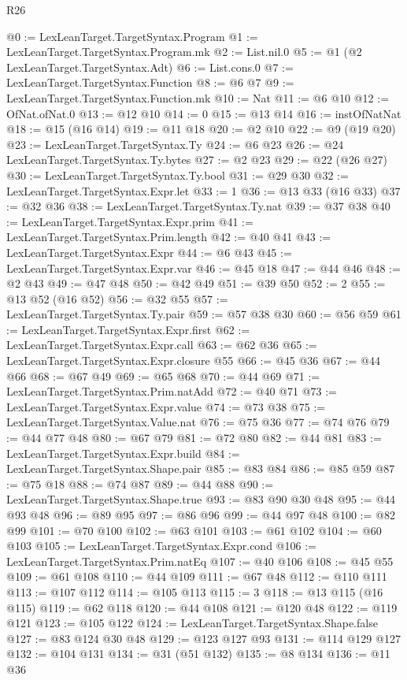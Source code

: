 \begin{lexlean}{R26}
\begin{coremodule}
@0 := LexLeanTarget.TargetSyntax.Program
@1 := LexLeanTarget.TargetSyntax.Program.mk
@2 := List.nil.{0}
@5 := @1 (@2 LexLeanTarget.TargetSyntax.Adt)
@6 := List.cons.{0}
@7 := LexLeanTarget.TargetSyntax.Function
@8 := @6 @7
@9 := LexLeanTarget.TargetSyntax.Function.mk
@10 := Nat
@11 := @6 @10
@12 := OfNat.ofNat.{0}
@13 := @12 @10
@14 := 0
@15 := @13 @14
@16 := instOfNatNat
@18 := @15 (@16 @14)
@19 := @11 @18
@20 := @2 @10
@22 := @9 (@19 @20)
@23 := LexLeanTarget.TargetSyntax.Ty
@24 := @6 @23
@26 := @24 LexLeanTarget.TargetSyntax.Ty.bytes
@27 := @2 @23
@29 := @22 (@26 @27)
@30 := LexLeanTarget.TargetSyntax.Ty.bool
@31 := @29 @30
@32 := LexLeanTarget.TargetSyntax.Expr.let
@33 := 1
@36 := @13 @33 (@16 @33)
@37 := @32 @36
@38 := LexLeanTarget.TargetSyntax.Ty.nat
@39 := @37 @38
@40 := LexLeanTarget.TargetSyntax.Expr.prim
@41 := LexLeanTarget.TargetSyntax.Prim.length
@42 := @40 @41
@43 := LexLeanTarget.TargetSyntax.Expr
@44 := @6 @43
@45 := LexLeanTarget.TargetSyntax.Expr.var
@46 := @45 @18
@47 := @44 @46
@48 := @2 @43
@49 := @47 @48
@50 := @42 @49
@51 := @39 @50
@52 := 2
@55 := @13 @52 (@16 @52)
@56 := @32 @55
@57 := LexLeanTarget.TargetSyntax.Ty.pair
@59 := @57 @38 @30
@60 := @56 @59
@61 := LexLeanTarget.TargetSyntax.Expr.first
@62 := LexLeanTarget.TargetSyntax.Expr.call
@63 := @62 @36
@65 := LexLeanTarget.TargetSyntax.Expr.closure @55
@66 := @45 @36
@67 := @44 @66
@68 := @67 @49
@69 := @65 @68
@70 := @44 @69
@71 := LexLeanTarget.TargetSyntax.Prim.natAdd
@72 := @40 @71
@73 := LexLeanTarget.TargetSyntax.Expr.value
@74 := @73 @38
@75 := LexLeanTarget.TargetSyntax.Value.nat
@76 := @75 @36
@77 := @74 @76
@79 := @44 @77 @48
@80 := @67 @79
@81 := @72 @80
@82 := @44 @81
@83 := LexLeanTarget.TargetSyntax.Expr.build
@84 := LexLeanTarget.TargetSyntax.Shape.pair
@85 := @83 @84
@86 := @85 @59
@87 := @75 @18
@88 := @74 @87
@89 := @44 @88
@90 := LexLeanTarget.TargetSyntax.Shape.true
@93 := @83 @90 @30 @48
@95 := @44 @93 @48
@96 := @89 @95
@97 := @86 @96
@99 := @44 @97 @48
@100 := @82 @99
@101 := @70 @100
@102 := @63 @101
@103 := @61 @102
@104 := @60 @103
@105 := LexLeanTarget.TargetSyntax.Expr.cond
@106 := LexLeanTarget.TargetSyntax.Prim.natEq
@107 := @40 @106
@108 := @45 @55
@109 := @61 @108
@110 := @44 @109
@111 := @67 @48
@112 := @110 @111
@113 := @107 @112
@114 := @105 @113
@115 := 3
@118 := @13 @115 (@16 @115)
@119 := @62 @118
@120 := @44 @108
@121 := @120 @48
@122 := @119 @121
@123 := @105 @122
@124 := LexLeanTarget.TargetSyntax.Shape.false
@127 := @83 @124 @30 @48
@129 := @123 @127 @93
@131 := @114 @129 @127
@132 := @104 @131
@134 := @31 (@51 @132)
@135 := @8 @134
@136 := @11 @36

\end{coremodule}
\end{lexlean}
